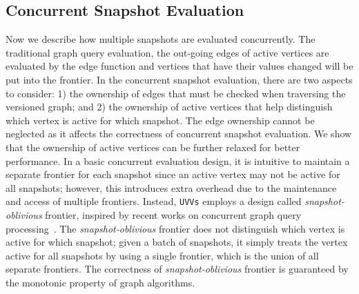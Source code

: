 \subsection{Concurrent Snapshot Evaluation}
Now we describe how multiple snapshots are evaluated concurrently.
The traditional graph query evaluation, the out-going edges of active vertices are evaluated by the edge function and vertices that have their values changed will be put into the frontier.
In the concurrent snapshot evaluation, there are two aspects to consider:
1) the ownership of edges that must be checked when traversing the versioned graph; and 2) the ownership of active vertices that help distinguish which vertex is active for which snapshot.
The edge ownership cannot be neglected as it affects the correctness of concurrent snapshot evaluation. We show that the ownership of active vertices can be further relaxed for better performance. In a basic concurrent evaluation design, it is intuitive to maintain a separate frontier for each snapshot since an active vertex may not be active for all snapshots; however, this introduces extra overhead due to the maintenance and access of multiple frontiers.
Instead, \texttt{UVVs} employs a design called \textit{snapshot-oblivious} frontier, inspired by recent works on concurrent graph query processing~\cite{yin2022glign,mazloumi2019multilyra}.
The \textit{snapshot-oblivious} frontier does not distinguish which vertex is active for which snapshot; given a batch of snapshots, it simply treats the vertex active for all snapshots by using a single frontier, which is the union of all separate frontiers. The correctness of \textit{snapshot-oblivious} frontier is guaranteed by the monotonic property of graph algorithms.


